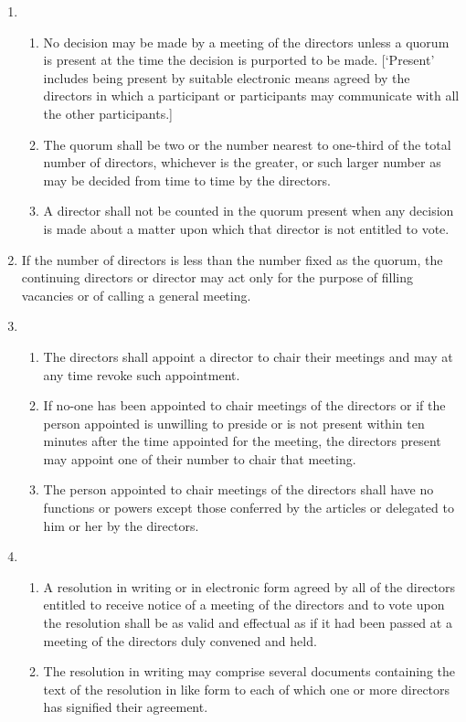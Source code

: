 \documentclass{article}
\begin{document}
\begin{enumerate}[label=\arabic*, start=23]
    \item \begin{enumerate}[label=(\arabic*)]
            \item No decision may be made by a meeting of the directors unless
            a quorum is present at the time the decision is purported to be
            made. [`Present' includes being present by suitable electronic
            means agreed by the directors in which a participant or
            participants may communicate with all the other participants.]
            \item The quorum shall be two or the number nearest to one-third
            of the total number of directors, whichever is the greater, or
            such larger number as may be decided from time to time by
            the directors.
            \item A director shall not be counted in the quorum present when any
            decision is made about a matter upon which that director is not
            entitled to vote.
    \end{enumerate}
    \item If the number of directors is less than the number fixed as the quorum,
    the continuing directors or director may act only for the purpose of
    filling vacancies or of calling a general meeting.
    \item \begin{enumerate}[label=(\arabic*)]
        \item The directors shall appoint a director to chair their meetings and
        may at any time revoke such appointment.
        \item If no-one has been appointed to chair meetings of the directors
        or if the person appointed is unwilling to preside or is not
        present within ten minutes after the time appointed for the
        meeting, the directors present may appoint one of their number
        to chair that meeting.
        \item The person appointed to chair meetings of the directors shall
        have no functions or powers except those conferred by the
        articles or delegated to him or her by the directors.
    \end{enumerate}
    \item \begin{enumerate}[label=(\arabic*)]
        \item A resolution in writing or in electronic form agreed by all of the
        directors entitled to receive notice of a meeting of the directors
        and to vote upon the resolution shall be as valid and effectual as
        if it had been passed at a meeting of the directors duly convened
        and held.
        \item The resolution in writing may comprise several documents
        containing the text of the resolution in like form to each of
        which one or more directors has signified their agreement.
    \end{enumerate}
    

\end{enumerate}
\end{document}

